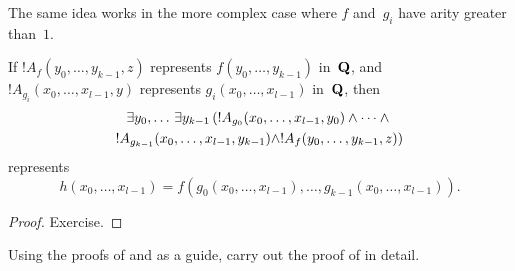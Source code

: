 \documentclass[../../../include/open-logic-section]{subfiles}
\begin{document}
The same idea works in the more complex case where $f$ and~$g_i$ have
arity greater than~$1$.

\begin{prop}
If $!A_f(y_0, \dots, y_{k-1}, z)$ represents $f(y_0, \dots, y_{k-1})$
in~$\mathbf{Q}$, and $!A_{g_i}(x_0, \dots, x_{l-1}, y)$ represents
$g_i(x_0, \dots, x_{l-1})$ in~$\mathbf{Q}$, then
\begin{multline*}
  \lexists[y_0,\dots][\lexists[y_{k-1}][(!A_{g_0}(x_0,\dots,x_{l-1},y_0) \land
      \dots \land {}]]\\
  !A_{g_{k-1}}(x_0,\dots,x_{l-1},y_{k-1}) \land !A_f(y_0,\dots,y_{k-1},z))
\end{multline*}
represents
\[
h(x_0, \dots, x_{l-1}) = f(g_0(x_0, \dots, x_{l-1}), \dots, g_{k-1}(x_0,
\dots, x_{l-1})).
\]
\end{prop}

\begin{proof}
Exercise.
\end{proof}

\begin{prob}
Using the proofs of  and
 as a guide, carry out the proof of
 in detail.
\end{prob}
\end{document}
